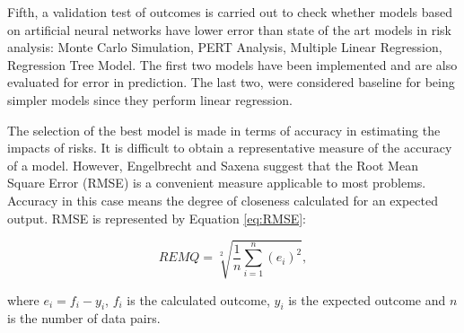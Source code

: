 Fifth, a validation test of outcomes is carried out to check whether models based on artificial neural networks have lower error than state of the art models in risk analysis: Monte Carlo Simulation, PERT Analysis, Multiple Linear Regression, Regression Tree Model. The first two models have been implemented and are also evaluated for error in prediction. The last two, were considered baseline for being simpler models since they perform linear regression.

The selection of the best model is made in terms of accuracy in estimating the impacts of risks. It is difficult to obtain a representative measure of the accuracy of a model. However, Engelbrecht \cite{engelbrecht2007computational} and Saxena \cite{saxena2012software} suggest that the Root Mean Square Error (RMSE) is a convenient measure applicable to most problems. Accuracy in this case means the degree of closeness calculated for an expected output. RMSE is represented by Equation \ref{eq:RMSE}:

\begin{equation}\label{eq:RMSE}
    REMQ= \sqrt[2]{\frac{1}{n}\sum_{i=1}^{n} (e_i)^2},
\end{equation}

where $e_i=f_i - y_i$, $f_i$ is the calculated outcome, $y_i$ is the expected outcome and $n$ is the number of data pairs.

